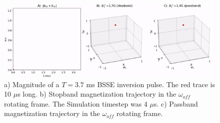 \documentclass{article}
\begin{document}
\begin{figure}[h]
\centering
\includegraphics[width=1.1\textwidth]{figures/magmotion_appendix.gif}
\caption{ a) Magnitude of a $T = 3.7$ ms BSSE inversion pulse. 
The red trace is 10 $\mu$s long. 
b) Stopband magnetization trajectory in the $\omega_{off}$ rotating frame. 
The Simulation timestep was 4 $\mu$s.
c) Passband magnetization trajectory in the $\omega_{off}$ rotating frame.}
\label{fig:magmotion_animated}
\end{figure}
\end{document}
